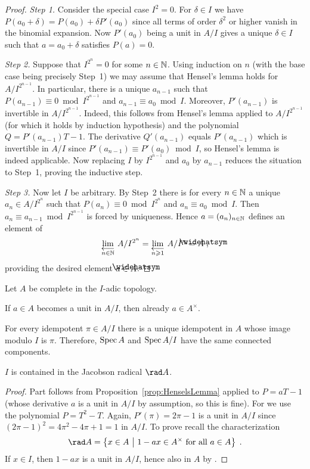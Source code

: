 \documentclass[a4paper,parskip=half,numbers=enddot, DIV=12]{scrreprt}
\renewcommand{\geq}{\geqslant}
\begin{document}
\begin{proof}
	\emph{Step 1.} Consider the special case $I^2=0$. For $\delta\in I$ we have $P(a_0+\delta)=P(a_0)+\delta P'(a_0)$ since all terms of order $\delta^2$ or higher vanish in the binomial expansion. Now $P'(a_0)$ being a unit in $A/I$ gives a unique $\delta\in I$ such that $a=a_0+\delta$ satisfies $P(a)=0$.
	
	\emph{Step 2.} Suppose that $I^{2^n}=0$ for some $n\in \mathbb{N}$. Using induction on $n$ (with the base case being precisely Step~1) we may assume that Hensel's lemma holds for $A/I^{2^{n-1}}$. In particular, there is a unique $a_{n-1}$ such that $P(a_{n-1})\equiv 0\bmod I^{2^{n-1}}$ and $a_{n-1}\equiv a_0\bmod I$. Moreover, $P'(a_{n-1})$ is invertible in $A/I^{2^{n-1}}$. Indeed, this follows from Hensel's lemma applied to $A/I^{2^{n-1}}$ (for which it holds by induction hypothesis) and the polynomial $Q=P'(a_{n-1})T-1$. The derivative $Q'(a_{n-1})$ equals $P'(a_{n-1})$ which is invertible in $A/I$ since $P'(a_{n-1})\equiv P'(a_0)\bmod I$, so Hensel's lemma is indeed applicable. Now replacing $I$ by $I^{2^{n-1}}$ and $a_0$ by $a_{n-1}$ reduces the situation to Step~1, proving the inductive step.
	
	\emph{Step 3.} Now let $I$ be arbitrary. By Step~2 there is for every $n\in\mathbb{N}$ a unique $a_n\in A/I^{2^n}$ such that $P(a_n)\equiv 0\bmod I^{2^n}$ and $a_n\equiv a_0\bmod I$. Then $a_n\equiv a_{n-1}\bmod I^{2^{n-1}}$ is forced by uniqueness. Hence $a=(a_n)_{n\in \mathbb{N}}$ defines an element of
	\begin{align*}
		\limit[n\in \IN]A/I^{2^n}=\limit[n\geq 1] A/I^n=\roof{A}\;,
	\end{align*}
	providing the desired element $a\in\roof{A}$.
\end{proof}
\begin{cor}
	Let $A$ be complete in the $I$-adic topology.
	\begin{alphanumerate}
		\item If $a\in A$ becomes a unit in $A/I$, then already $a\in A^\times$.
		\item For every idempotent $\pi\in A/I$ there is a unique idempotent in $A$ whose image modulo $I$ is $\pi $. Therefore, $\operatorname{Spec} A$ and $\operatorname{Spec} A/I$ have the same connected components.
		\item $I$ is contained in the Jacobson radical $\rad A$.
	\end{alphanumerate}
\end{cor}
\begin{proof}
	Part  follows from Proposition~\ref{prop:HenselsLemma} applied to $P=aT-1$ (whose derivative $a$ is a unit in $A/I$ by assumption, so this is fine). For  we use the polynomial $P=T^2-T$. Again, $P'(\pi )=2\pi -1$ is a unit in $A/I$ since $(2\pi -1)^2=4\pi ^2-4\pi +1=1$ in $A/I$. To prove  recall the characterization
	\begin{align*}
		\rad A=\left\{x\in A\st 1-ax\in A^\times\text{ for all }a\in A\right\}\;.
	\end{align*}
	If $x\in I$, then $1-ax$ is a unit in $A/I$, hence also in $A$ by .
\end{proof}
\end{document}
